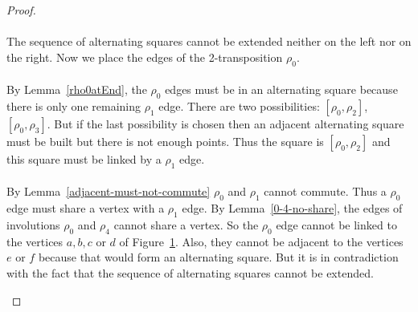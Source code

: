 \begin{proof}
\begin{figure}[H]
\begin{center}
\begin{tikzpicture}[scale=.8]
    \end{tikzpicture}
    \caption{}
    \label{proof-5-3}
  \end{center}
\end{figure}

\paragraph{}
The sequence of alternating squares cannot be extended neither on the left nor on the right. Now we place the edges of the 2-transposition $\rho_0$.

\paragraph{}
By Lemma~\ref{rho0atEnd}, the $\rho_0$ edges must be in an alternating square because there is only one remaining $\rho_1$ edge. There are two possibilities: $[\rho_0, \rho_2]$, $[\rho_0, \rho_3]$. But if the last possibility is chosen then an adjacent alternating square must be built but there is not enough points. Thus the square is $[\rho_0, \rho_2]$ and this square must be linked by a $\rho_1$ edge.

\paragraph{}
By Lemma~\ref{adjacent-must-not-commute} $\rho_0$ and $\rho_1$ cannot commute. Thus a $\rho_0$ edge must share a vertex with a $\rho_1$ edge. By Lemma~\ref{0-4-no-share}, the edges of involutions $\rho_0$ and $\rho_4$ cannot share a vertex. So the $\rho_0$ edge cannot be linked to the vertices $a, b, c$ or $d$ of Figure~\ref{proof-5-3}. Also, they cannot be adjacent to the vertices $e$ or $f$ because that would form an alternating square. But it is in contradiction with the fact that the sequence of alternating squares cannot be extended.

\begin{figure}[H]
  \begin{center}
\end{center}
\end{figure}
\end{proof}
